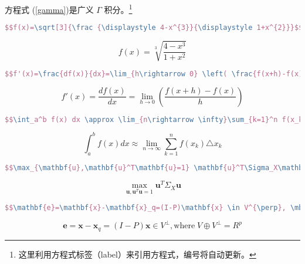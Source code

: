 方程式 (\ref{gamma})是广义 $\Gamma$ 积分。\footnote{这里利用方程式标签（label）来引用方程式，编号将自动更新。}
 
\begin{lstlisting}[language=TeX,numbers=none,frame=lrtb,keywords={begin},label=Sqrt,caption=开根号] 
$$f(x)=\sqrt[3]{\frac {\displaystyle 4-x^{3}}{\displaystyle 1+x^{2}}}$$
\end{lstlisting}
$$f(x)=\sqrt[3]{\frac {\displaystyle 4-x^{3}}{\displaystyle 1+x^{2}}}$$
  
\begin{lstlisting}[language=TeX,numbers=none,frame=lrtb,keywords={begin},label=limit,caption=微分与极限（注意大刮号的使用）] 
$$f'(x)=\frac{df(x)}{dx}=\lim_{h\rightarrow 0} \left( \frac{f(x+h)-f(x)}{h} \right)$$
\end{lstlisting}  
$$f'(x)=\frac{df(x)}{dx}=\lim_{h\rightarrow 0}\left(\frac{f(x+h)-f(x)}{h}\right)$$

\begin{lstlisting}[language=TeX,numbers=none,frame=lrtb,keywords={begin},label=upanddown,caption=上下限的使用] 
$$\int_a^b f(x) dx \approx \lim_{n\rightarrow \infty}\sum_{k=1}^n f(x_k)\triangle x_k$$
\end{lstlisting} 
$$\int_a^b f(x) dx \approx \lim_{n\rightarrow \infty}\sum_{k=1}^n f(x_k)\triangle x_k$$
  
\begin{lstlisting}[language=TeX,numbers=none,frame=lrtb,keywords={begin},label=bast,caption=最佳化问题] 
$$\max_{\mathbf{u},\mathbf{u}^T\mathbf{u}=1} \mathbf{u}^T\Sigma_X\mathbf{u}$$
\end{lstlisting} 
$$\max_{\mathbf{u},\mathbf{u}^T\mathbf{u}=1} \mathbf{u}^T\Sigma_X\mathbf{u}$$
  
\begin{lstlisting}[language=TeX,numbers=none,frame=lrtb,keywords={begin},label=somesymbles,caption=几个符号]
$$\mathbf{e}=\mathbf{x}-\mathbf{x}_q=(I-P)\mathbf{x} \in V^{\perp}, \mbox{where}\; V\oplus V^{\perp}=R^p $$
\end{lstlisting} 
$$\mathbf{e}=\mathbf{x}-\mathbf{x}_q=(I-P)\mathbf{x} \in V^{\perp}, \mbox{where}\; V\oplus V^{\perp}=R^p $$


